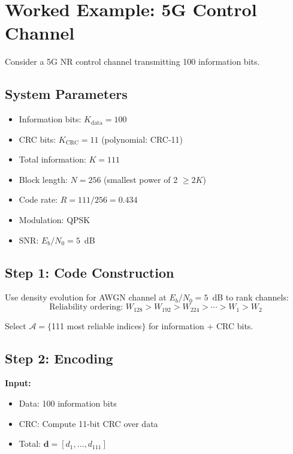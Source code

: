 \section{Worked Example: 5G Control Channel}

Consider a 5G NR control channel transmitting 100 information bits.

\subsection*{System Parameters}

\begin{itemize}
\item Information bits: $K_{\text{data}} = 100$
\item CRC bits: $K_{\text{CRC}} = 11$ (polynomial: CRC-11)
\item Total information: $K = 111$
\item Block length: $N = 256$ (smallest power of 2 $\geq 2K$)
\item Code rate: $R = 111/256 = 0.434$
\item Modulation: QPSK
\item SNR: $E_b/N_0 = 5$~dB
\end{itemize}

\subsection*{Step 1: Code Construction}

Use density evolution for AWGN channel at $E_b/N_0 = 5$~dB to rank channels:
\begin{equation}
\text{Reliability ordering: } W_{128} > W_{192} > W_{224} > \cdots > W_1 > W_2
\end{equation}

Select $\mathcal{A} = \{$111 most reliable indices$\}$ for information + CRC bits.

\subsection*{Step 2: Encoding}

\textbf{Input:}
\begin{itemize}
\item Data: 100 information bits
\item CRC: Compute 11-bit CRC over data
\item Total: $\mathbf{d} = [d_1, \ldots, d_{111}]$
\end{itemize}

